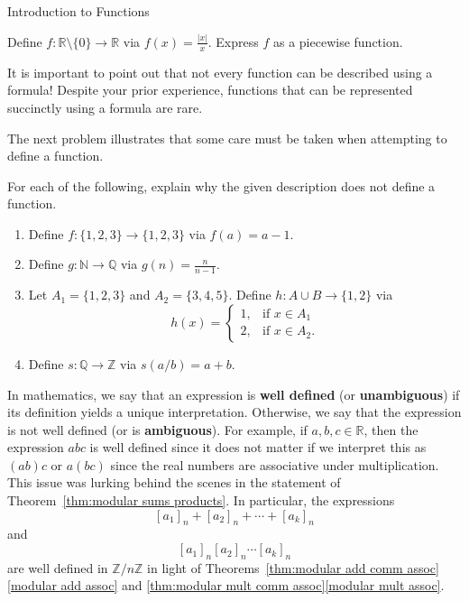 \begin{section}{Introduction to Functions}
\begin{problem}
Define $f:\mathbb{R}\setminus\{0\}\to \mathbb{R}$ via $f(x)=\frac{|x|}{x}$. Express $f$ as a piecewise function.
\end{problem}

It is important to point out that not every function can be described using a formula! Despite your prior experience, functions that can be represented succinctly using a formula are rare.

The next problem illustrates that some care must be taken when attempting to define a function.

\begin{problem}\label{prob:not well defined}
For each of the following, explain why the given description does not define a function.
\begin{enumerate}[label=\textrm{(\alph*)}]
\item Define $f:\{1,2,3\}\to \{1,2,3\}$ via $f(a)=a-1$.
\item Define $g:\mathbb{N}\to \mathbb{Q}$ via $g(n)=\frac{n}{n-1}$.
\item Let $A_1=\{1,2,3\}$ and $A_2=\{3,4,5\}$. Define $h:A\cup B\to \{1,2\}$ via
\[
h(x)=\begin{cases}
1, & \mbox{if }x\in A_1\\
2, & \mbox{if }x\in A_2.
\end{cases}
\]
\item Define $s:\mathbb{Q}\to \mathbb{Z}$ via $s(a/b)=a+b$.
\end{enumerate}
\end{problem}

In mathematics, we say that an expression is \textbf{well defined} (or \textbf{unambiguous}) if its definition yields a unique interpretation.  Otherwise, we say that the expression is not well defined (or is \textbf{ambiguous}).  For example, if $a,b,c\in\mathbb{R}$, then the expression $abc$ is well defined since it does not matter if we interpret this as $(ab)c$ or $a(bc)$ since the real numbers are associative under multiplication.  This issue was lurking behind the scenes in the statement of Theorem~\ref{thm:modular sums products}.  In particular, the expressions
\[
[a_1]_n+[a_2]_n+\cdots+ [a_k]_n
\]
and
\[
[a_1]_n [a_2]_n \cdots  [a_k]_n
\]
are well defined in $\mathbb{Z}/n\mathbb{Z}$ in light of Theorems~\ref{thm:modular add comm assoc}\ref{modular add assoc} and \ref{thm:modular mult comm assoc}\ref{modular mult assoc}.


\end{section}
